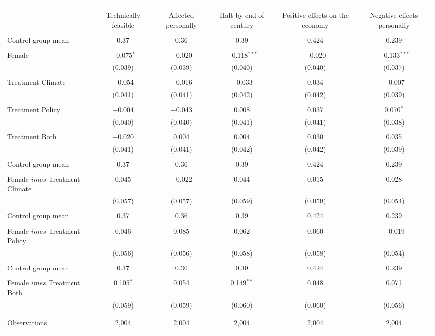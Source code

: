 
\begin{tabular}{@{\extracolsep{5pt}}lccccc} 
\\[-1.8ex]\hline 
\hline \\[-1.8ex] 
\\[-1.8ex] & Technically feasible & Affected personally & Halt by end of century & Positive effects on the economy & Negative effects personally \\ 
\hline \\[-1.8ex] 
 Control group mean & 0.37 & 0.36 & 0.39 & 0.424 & 0.239  \\ \hline \\[-1.8ex] Female & $-$0.075$^{*}$ & $-$0.020 & $-$0.118$^{***}$ & $-$0.020 & $-$0.133$^{***}$ \\ 
  & (0.039) & (0.039) & (0.040) & (0.040) & (0.037) \\ 
  & & & & & \\ 
 Treatment Climate & $-$0.054 & $-$0.016 & $-$0.033 & 0.034 & $-$0.007 \\ 
  & (0.041) & (0.041) & (0.042) & (0.042) & (0.039) \\ 
  & & & & & \\ 
 Treatment Policy & $-$0.004 & $-$0.043 & 0.008 & 0.037 & 0.070$^{*}$ \\ 
  & (0.040) & (0.040) & (0.041) & (0.041) & (0.038) \\ 
  & & & & & \\ 
 Treatment Both & $-$0.020 & 0.004 & 0.004 & 0.030 & 0.035 \\ 
  & (0.041) & (0.041) & (0.042) & (0.042) & (0.039) \\ 
  & & & & & \\ 
 Control group mean & 0.37 & 0.36 & 0.39 & 0.424 & 0.239  \\ \hline \\[-1.8ex] Female $	imes$ Treatment Climate & 0.045 & $-$0.022 & 0.044 & 0.015 & 0.028 \\ 
  & (0.057) & (0.057) & (0.059) & (0.059) & (0.054) \\ 
  & & & & & \\ 
 Control group mean & 0.37 & 0.36 & 0.39 & 0.424 & 0.239  \\ \hline \\[-1.8ex] Female $	imes$ Treatment Policy & 0.046 & 0.085 & 0.062 & 0.060 & $-$0.019 \\ 
  & (0.056) & (0.056) & (0.058) & (0.058) & (0.054) \\ 
  & & & & & \\ 
 Control group mean & 0.37 & 0.36 & 0.39 & 0.424 & 0.239  \\ \hline \\[-1.8ex] Female $	imes$ Treatment Both & 0.105$^{*}$ & 0.054 & 0.149$^{**}$ & 0.048 & 0.071 \\ 
  & (0.059) & (0.059) & (0.060) & (0.060) & (0.056) \\ 
  & & & & & \\ 
\hline \\[-1.8ex] 

Observations & 2,004 & 2,004 & 2,004 & 2,004 & 2,004 \\ 
\hline 
\hline \\[-1.8ex] 
\end{tabular} 